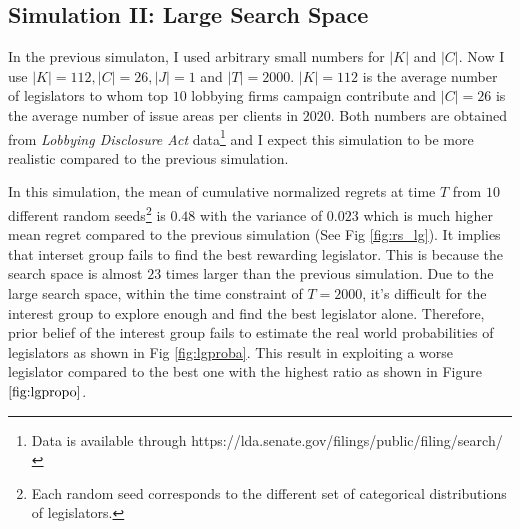 \documentclass{article}
\begin{document}
\subsection{Simulation II: Large Search Space}
In the previous simulaton, 
I used 
arbitrary small numbers for $|K|$ and $|C|$.
Now I use $|K|=112, |C|=26, |J|=1$ and $|T|=2000$.
$|K|=112$ is the average number of 
legislators to whom top 
$10$ lobbying firms campaign contribute 
and $|C|=26$ is the average number of
issue areas per clients in $2020$.
Both numbers are obtained from \textit{Lobbying Disclosure Act} data\footnote{Data is available through https://lda.senate.gov/filings/public/filing/search/}
and I expect this simulation to be more realistic compared to the previous simulation.

In this simulation, the mean of cumulative normalized regrets at time $T$ from 
$10$ different random seeds\footnote{Each random seed  
corresponds to the different set of categorical distributions of legislators. 
} is $0.48$ with the variance of $0.023$ which is much higher mean regret compared to the previous simulation 
(See Fig \ref{fig:rs_lg}).
It implies that interset group fails to find the best rewarding legislator.
This is because 
the search space is almost $23$ times larger than the previous simulation.
Due to the large search space, 
within the time constraint of $T=2000$,
it's difficult for the interest group to 
explore enough and find the best legislator alone.
Therefore, prior belief of the interest group fails to estimate 
the real world probabilities of legislators as shown in Fig \ref{fig:lgproba}.
This result in exploiting 
a worse legislator compared to the best one with the highest ratio 
as shown in Figure $\ref{fig:lgpropo}$.
\end{document}
